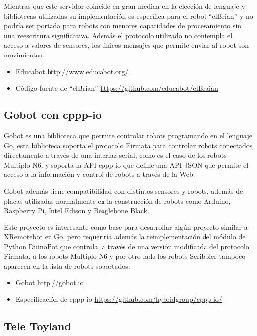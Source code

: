 Mientras que este servidor coincide en gran medida en la elección de lenguaje
y bibliotecas utilizadas su implementación es específica para el robot ``elBrian''
y no podría ser portada para robots con menores capacidades de procesamiento
sin una reescritura significativa. Además el protocolo utilizado no contempla
el acceso a valores de sensores, los únicos mensajes que permite enviar
al robot son movimientos.

\begin{itemize}
    \item Educabot \url{http://www.educabot.org/}
    \item Código fuente de ``elBrian'' \url{https://github.com/educabot/elBraian}
\end{itemize}

\subsection{Gobot con cppp-io}

Gobot es una biblioteca que permite controlar robots programando en el lenguaje
Go, esta biblioteca soporta el protocolo Firmata para controlar robots
conectados directamente a través de una interfaz serial, como es el caso
de los robots Multiplo N6, y soporta la API cppp-io que define una API JSON
que permite el acceso a la información y control de robots a través de la Web.

Gobot además tiene compatibilidad con distintos sensores y robots, además de
placas utilizadas normalmente en la construcción de robots como Arduino,
Raspberry Pi, Intel Edison y Beaglebone Black.

Este proyecto es interesante como base para desarrollar algún proyecto
similar a XRemotebot en Go, pero requeriría además la reimplementación
del módulo de Python DuinoBot que controla, a través de una versión
modificada del protocolo Firmata, a los robots Multiplo N6 y por otro
lado los robots Scribbler tampoco aparecen en la lista de robots soportados.

\begin{itemize}
    \item Gobot \url{http://gobot.io}
    \item Especificación de cppp-io \url{https://github.com/hybridgroup/cppp-io/}
\end{itemize}

\subsection{Tele Toyland}


